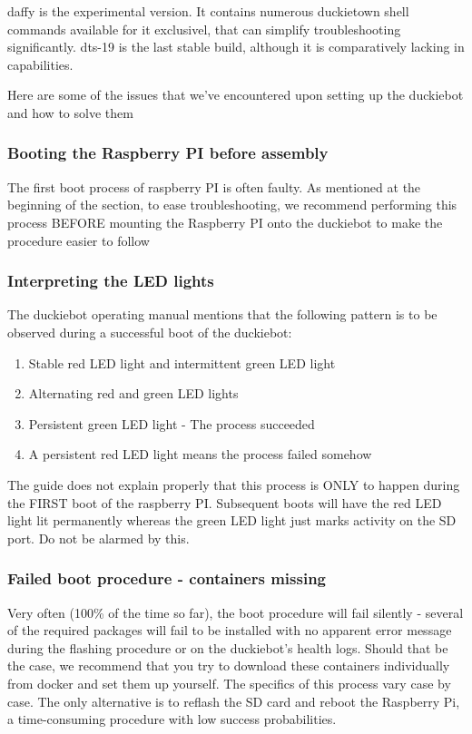 daffy is the experimental version. It contains numerous duckietown shell commands available for it exclusivel, that can simplify troubleshooting significantly. dts-19 is the last stable build, although it is comparatively lacking in capabilities.

Here are some of the issues that we've encountered upon setting up the duckiebot and how to solve them

\subsubsection{Booting the Raspberry PI before assembly}

The first boot process of raspberry PI is often faulty. As mentioned at the beginning of the section, to ease troubleshooting, we recommend performing this process BEFORE mounting the Raspberry PI onto the duckiebot to make the procedure easier to follow
\subsubsection{Interpreting the LED lights}
The duckiebot operating manual mentions that the following pattern is to be observed during a successful boot of the duckiebot:

\begin{enumerate}
    \item Stable red LED light and intermittent green LED light
    \item Alternating red and green LED lights
    \item Persistent green LED light - The process succeeded
    \item A persistent red LED light means the process failed somehow
\end{enumerate}

The guide does not explain properly that this process is ONLY to happen during the FIRST boot of the raspberry PI. Subsequent boots will have the red LED light lit permanently whereas the green LED light just marks activity on the SD port. Do not be alarmed by this.

\subsubsection{Failed boot procedure - containers missing}

Very often (100\% of the time so far), the boot procedure will fail silently - several of the required packages will fail to be installed with no apparent error message during the flashing procedure or on the duckiebot's health logs. Should that be the case, we recommend that you try to download these containers individually from docker and set them up yourself. The specifics of this process vary case by case. The only alternative is to reflash the SD card and reboot the Raspberry Pi, a time-consuming procedure with low success probabilities.

